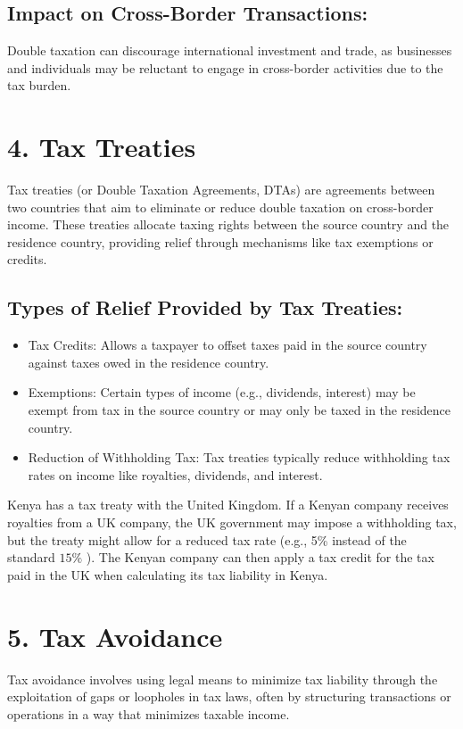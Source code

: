 \documentclass[10pt]{article}
\begin{document}
\subsection*{Impact on Cross-Border Transactions:}
Double taxation can discourage international investment and trade, as businesses and individuals may be reluctant to engage in cross-border activities due to the tax burden.

\section*{4. Tax Treaties}
\begin{definition}
	Tax treaties (or Double Taxation Agreements, DTAs) are agreements between two countries that aim to eliminate or reduce double taxation on cross-border income. These treaties allocate taxing rights between the source country and the residence country, providing relief through mechanisms like tax exemptions or credits.
\end{definition}


\subsection*{Types of Relief Provided by Tax Treaties:}
\begin{itemize}
  \item Tax Credits: Allows a taxpayer to offset taxes paid in the source country against taxes owed in the residence country.
  \item Exemptions: Certain types of income (e.g., dividends, interest) may be exempt from tax in the source country or may only be taxed in the residence country.
  \item Reduction of Withholding Tax: Tax treaties typically reduce withholding tax rates on income like royalties, dividends, and interest.
\end{itemize}

\begin{example}
	Kenya has a tax treaty with the United Kingdom. If a Kenyan company receives royalties from a UK company, the UK government may impose a withholding tax, but the treaty might allow for a reduced tax rate (e.g., 5\% instead of the standard $15 \%$ ). The Kenyan company can then apply a tax credit for the tax paid in the UK when calculating its tax liability in Kenya.
\end{example}


\section*{5. Tax Avoidance}
\begin{definition}
	Tax avoidance involves using legal means to minimize tax liability through the exploitation of gaps or loopholes in tax laws, often by structuring transactions or operations in a way that minimizes taxable income.
\end{definition}
\end{document}
